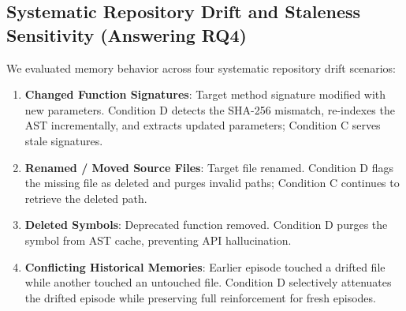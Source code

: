 \documentclass[conference]{IEEEtran}
\begin{document}
\subsection{Systematic Repository Drift and Staleness Sensitivity (Answering RQ4)}
We evaluated memory behavior across four systematic repository drift scenarios:
\begin{enumerate}
    \item \textbf{Changed Function Signatures}: Target method signature modified with new parameters. Condition D detects the SHA-256 mismatch, re-indexes the AST incrementally, and extracts updated parameters; Condition C serves stale signatures.
    \item \textbf{Renamed / Moved Source Files}: Target file renamed. Condition D flags the missing file as deleted and purges invalid paths; Condition C continues to retrieve the deleted path.
    \item \textbf{Deleted Symbols}: Deprecated function removed. Condition D purges the symbol from AST cache, preventing API hallucination.
    \item \textbf{Conflicting Historical Memories}: Earlier episode touched a drifted file while another touched an untouched file. Condition D selectively attenuates the drifted episode while preserving full reinforcement for fresh episodes.
\end{enumerate}

\begin{table}[!t]
\caption{Staleness Attenuation Factor ($\lambda$) Sensitivity Analysis}
\label{tab:staleness_sweep}
\centering
\setlength{\tabcolsep}{2.5pt}
\end{table}
\end{document}
